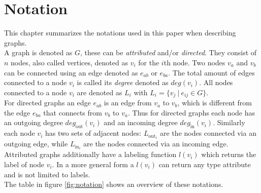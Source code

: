 \documentclass[
    12pt,                               %
    DIV=14,                     %
    parskip=half+,              %
    bigheadings,                %
    cleardoubleempty,   %
    halfparskip,                %
    ]{scrreprt} %
\begin{document}
\chapter{Notation} \label{chap:notation}
This chapter summarizes the notations used in this paper when describing graphs. \\
A graph is denoted as $G$, these can be \textit{attributed} and/or \textit{directed}. They consist of $n$ nodes, also called vertices, denoted as $v_i$ for the $i$th node. Two nodes $v_a$ and $v_b$ can be connected using an edge denoted as $e_{ab}$ or $e_{ba}$. The total amount of edges connected to a node $v_i$ is called its \textit{degree} denoted as $deg(v_i)$. All nodes connected to a node $v_i$ are denoted as $L_i$ with $L_i = \{v_j \: | \: e_{ij} \in G\}$. \\
For directed graphs an edge $e_{ab}$ is an edge from $v_a$ to $v_b$, which is different from the edge $e_{ba}$ that connects from $v_b$ to $v_a$. Thus for directed graphs each node has an outgoing degree $deg_{\text{out}}(v_i)$ and an incoming degree $deg_{\text{in}}(v_i)$. Similarly each node $v_i$ has two sets of adjacent nodes: $L_{\text{out}_i}$ are the nodes connected via an outgoing edge, while $L_{\text{in}_i}$ are the nodes connected via an incoming edge. \\
Attributed graphs additionally have a labeling function $l(v_i)$ which returns the label of node $v_i$. In a more general form a $l(v_i)$ can return any type attribute and is not limited to labels. \\
The table in figure \ref{fig:notation} shows an overview of these notations. \\
\end{document}
